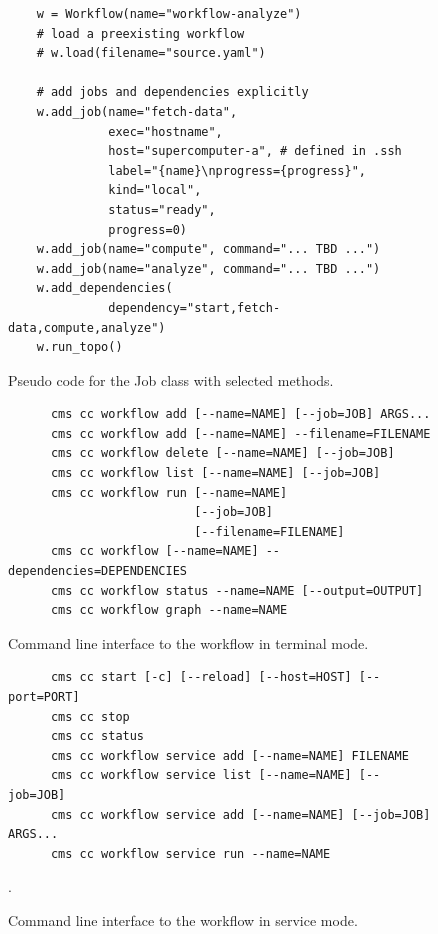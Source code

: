 \documentclass[sigplan,screen]{acmart}
\begin{document}
\begin{figure}[htb]
{\scriptsize
\begin{verbatim}
    w = Workflow(name="workflow-analyze")
    # load a preexisting workflow
    # w.load(filename="source.yaml")
    
    # add jobs and dependencies explicitly
    w.add_job(name="fetch-data",
              exec="hostname",
              host="supercomputer-a", # defined in .ssh
              label="{name}\nprogress={progress}",
              kind="local",
              status="ready",
              progress=0)
    w.add_job(name="compute", command="... TBD ...")
    w.add_job(name="analyze", command="... TBD ...")
    w.add_dependencies(
              dependency="start,fetch-data,compute,analyze")
    w.run_topo()
\end{verbatim}}
\caption{Pseudo code for the Job class with selected methods.}
\label{fig:code-workflow-example}

\bigskip

{\scriptsize
\begin{verbatim}
      cms cc workflow add [--name=NAME] [--job=JOB] ARGS...
      cms cc workflow add [--name=NAME] --filename=FILENAME
      cms cc workflow delete [--name=NAME] [--job=JOB]
      cms cc workflow list [--name=NAME] [--job=JOB]
      cms cc workflow run [--name=NAME] 
                          [--job=JOB] 
                          [--filename=FILENAME]
      cms cc workflow [--name=NAME] --dependencies=DEPENDENCIES
      cms cc workflow status --name=NAME [--output=OUTPUT]
      cms cc workflow graph --name=NAME
\end{verbatim}
\caption{Command line interface to the workflow in terminal mode.}
\label{fig:code-workflow-commandline}

\bigskip

{\scriptsize
\begin{verbatim}
      cms cc start [-c] [--reload] [--host=HOST] [--port=PORT]
      cms cc stop
      cms cc status
      cms cc workflow service add [--name=NAME] FILENAME
      cms cc workflow service list [--name=NAME] [--job=JOB]
      cms cc workflow service add [--name=NAME] [--job=JOB] ARGS...
      cms cc workflow service run --name=NAME
\end{verbatim}}
\caption{Command line interface to the workflow in service mode.}
\label{fig:code-workflow-service-commandline}.


}
\end{figure}
\end{document}
